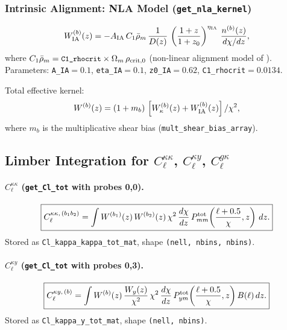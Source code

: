 \documentclass[12pt,a4paper]{article}
\newcommand{\code}[1]{\texttt{\small #1}}
\newcommand{\param}[1]{\texttt{\small #1}}
\begin{document}
\subsubsection{Intrinsic Alignment: NLA Model (\code{get\_nla\_kernel})}
\begin{equation}
  W_{\rm IA}^{(b)}(z) = -A_{\rm IA}\,C_1\bar\rho_m\,\frac{1}{D(z)}\,
  \left(\frac{1+z}{1+z_0}\right)^{\eta_{\rm IA}}\,
  \frac{n^{(b)}(z)}{d\chi/dz},
\end{equation}
where $C_1\bar\rho_m = \param{C1\_rhocrit}\times\Omega_m\,\rho_{\rm crit,0}$
(non-linear alignment model of \citealt{Hirata2004,Bridle2007}).
Parameters: \param{A\_IA}$=0.1$, \param{eta\_IA}$=0.1$, \param{z0\_IA}$=0.62$,
\param{C1\_rhocrit}$=0.0134$.

Total effective kernel:
\begin{equation}
  W^{(b)}(z) = (1+m_b)\,\left[W_\kappa^{(b)}(z) + W_{\rm IA}^{(b)}(z)\right] / \chi^2,
\end{equation}
where $m_b$ is the multiplicative shear bias (\param{mult\_shear\_bias\_array}).

\subsection{Limber Integration for $C_\ell^{\kappa\kappa}$, $C_\ell^{\kappa y}$, $C_\ell^{g\kappa}$}
\label{sec:Clkk}

\paragraph{$C_\ell^{\kappa\kappa}$ (\code{get\_Cl\_tot} with probes 0,0).}
\begin{equation}
  \boxed{C_\ell^{\kappa\kappa,\,(b_1 b_2)} = \int
  W^{(b_1)}(z)\,W^{(b_2)}(z)\,
  \chi^2\,\frac{d\chi}{dz}\,
  P^{\rm tot}_{mm}\!\left(\frac{\ell+0.5}{\chi},z\right)\,dz.}
\end{equation}
Stored as \code{Cl\_kappa\_kappa\_tot\_mat}, shape \code{(nell, nbins, nbins)}.

\paragraph{$C_\ell^{\kappa y}$ (\code{get\_Cl\_tot} with probes 0,3).}
\begin{equation}
  \boxed{C_\ell^{\kappa y,\,(b)} = \int
  W^{(b)}(z)\,\frac{W_y(z)}{\chi^2}\,
  \chi^2\,\frac{d\chi}{dz}\,
  P^{\rm tot}_{ym}\!\left(\frac{\ell+0.5}{\chi},z\right)B(\ell)\,dz.}
\end{equation}
Stored as \code{Cl\_kappa\_y\_tot\_mat}, shape \code{(nell, nbins)}.
\end{document}
